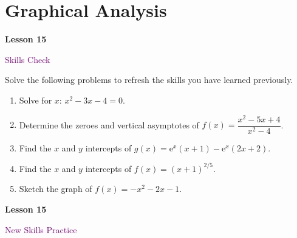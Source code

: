 \documentclass[10pt]{book}
\theoremstyle{definition}
\theoremstyle{remark}
\begin{document}
\section{Graphical Analysis}
\begin{tcolorbox}[
  width=\textwidth,
  colback=gray!10, %
  colframe=white, %
  boxrule=0pt,    %
  left=1cm,       %
  right=1cm,      %
  sharp corners  %
]

\begin{minipage}[t]{0.5\textwidth}
  \Huge \textbf{Lesson 15}
\end{minipage}%
\hfill
\begin{minipage}[t]{0.5\textwidth}
  \Huge \textcolor{purple}{Skills Check}
\end{minipage}
\end{tcolorbox}

\begin{large}
\noindent
Solve the following problems to refresh the skills you have learned previously.
\begin{enumerate}
\item Solve for $x$: $x^{2}-3x-4=0$.\vfil \vfil \vfil
\item Determine the zeroes and vertical asymptotes of $f(x)=\dfrac{x^{2}-5x+4}{x^{2}-4}$.\vfil \vfil\vfil
\item Find the $x$ and $y$ intercepts of $g(x)=\textrm{e}^{x}(x+1)-\textrm{e}^{x}(2x+2)$.\vfil \vfil \vfil
\item Find the $x$ and $y$ intercepts of $f(x)=(x+1)^{2/5}$.\vfil \vfil \vfil
\item Sketch the graph of $ f (x) = -x^2 - 2x - 1$.\vfil \vfil \vfil
\end{enumerate}
\end{large}
\newpage


\begin{tcolorbox}[
  width=\textwidth,
  colback=gray!10, %
  colframe=white, %
  boxrule=0pt,    %
  left=1cm,       %
  right=1cm,      %
  sharp corners  %
]

\begin{minipage}[t]{0.5\textwidth}
  \Huge \textbf{Lesson 15}
\end{minipage}%
\hfill
\begin{minipage}[t]{0.5\textwidth}
  \Huge\textcolor{purple}{New Skills Practice}
\end{minipage}
\end{tcolorbox}
\end{document}
